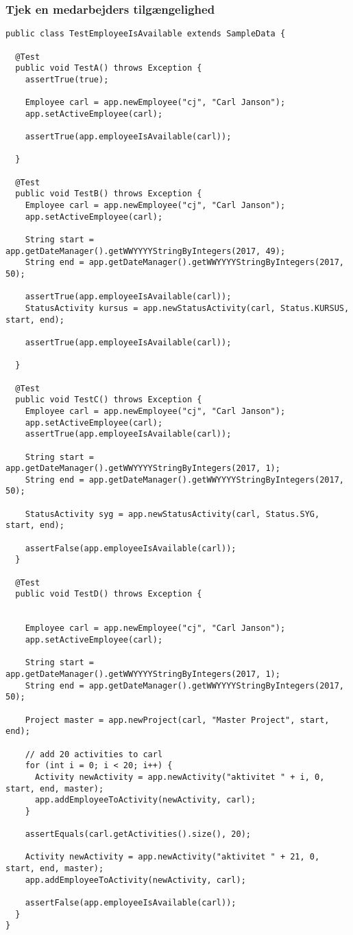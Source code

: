 
\subsubsection{Tjek en medarbejders tilgængelighed}
\begin{lstlisting}
public class TestEmployeeIsAvailable extends SampleData {

  @Test
  public void TestA() throws Exception {
    assertTrue(true); 
        
    Employee carl = app.newEmployee("cj", "Carl Janson");
    app.setActiveEmployee(carl);

    assertTrue(app.employeeIsAvailable(carl));

  }

  @Test
  public void TestB() throws Exception {
    Employee carl = app.newEmployee("cj", "Carl Janson");
    app.setActiveEmployee(carl);

    String start = app.getDateManager().getWWYYYYStringByIntegers(2017, 49);
    String end = app.getDateManager().getWWYYYYStringByIntegers(2017, 50);

    assertTrue(app.employeeIsAvailable(carl));     
    StatusActivity kursus = app.newStatusActivity(carl, Status.KURSUS, start, end);

    assertTrue(app.employeeIsAvailable(carl));

  }

  @Test
  public void TestC() throws Exception {
    Employee carl = app.newEmployee("cj", "Carl Janson");
    app.setActiveEmployee(carl);
    assertTrue(app.employeeIsAvailable(carl)); 

    String start = app.getDateManager().getWWYYYYStringByIntegers(2017, 1);
    String end = app.getDateManager().getWWYYYYStringByIntegers(2017, 50);

    StatusActivity syg = app.newStatusActivity(carl, Status.SYG, start, end);

    assertFalse(app.employeeIsAvailable(carl));
  }

  @Test
  public void TestD() throws Exception {

    
    Employee carl = app.newEmployee("cj", "Carl Janson");
    app.setActiveEmployee(carl);

    String start = app.getDateManager().getWWYYYYStringByIntegers(2017, 1);
    String end = app.getDateManager().getWWYYYYStringByIntegers(2017, 50);

    Project master = app.newProject(carl, "Master Project", start, end);

    // add 20 activities to carl
    for (int i = 0; i < 20; i++) {
      Activity newActivity = app.newActivity("aktivitet " + i, 0, start, end, master);
      app.addEmployeeToActivity(newActivity, carl);
    }
    
    assertEquals(carl.getActivities().size(), 20); 

    Activity newActivity = app.newActivity("aktivitet " + 21, 0, start, end, master);
    app.addEmployeeToActivity(newActivity, carl);
    
    assertFalse(app.employeeIsAvailable(carl));
  }
}
\end{lstlisting}
